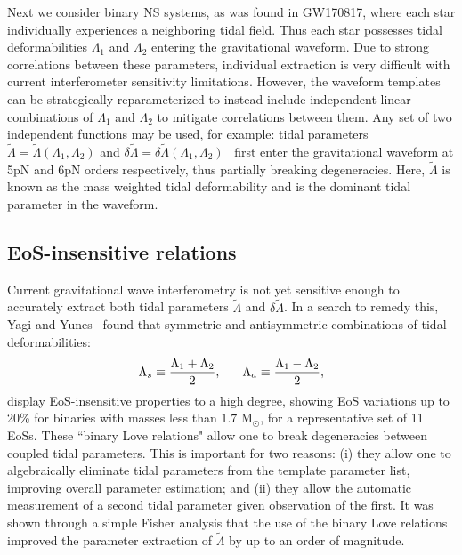 \documentclass[prd,twocolumn,nofootinbib,superscriptaddress,amsmath,amssymb]{revtex4-1}
\begin{document}
Next we consider binary NS systems, as was found in GW170817, where each star individually experiences a neighboring tidal field.
Thus each star possesses tidal deformabilities $\Lambda_1$ and $\Lambda_2$ entering the gravitational waveform.
Due to strong correlations between these parameters, individual extraction is very difficult with current interferometer sensitivity limitations.
However, the waveform templates can be strategically reparameterized to instead include independent linear combinations of $\Lambda_1$ and $\Lambda_2$ to mitigate correlations between them. 
Any set of two independent functions may be used, for example: tidal parameters $\tilde{\Lambda}=\tilde{\Lambda}(\Lambda_1,\Lambda_2)$ and $\delta \tilde{\Lambda}=\delta \tilde{\Lambda}(\Lambda_1,\Lambda_2)$~\cite{Wade:tidalCorrections} first enter the gravitational waveform at 5pN and 6pN orders respectively, thus partially breaking degeneracies.
Here, $\tilde{\Lambda}$ is known as the mass weighted tidal deformability and is the dominant tidal parameter in the waveform. 

\subsection{EoS-insensitive relations}\label{sec:eosInsensitive}
Current gravitational wave interferometry is not yet sensitive enough to accurately extract both tidal parameters $\tilde{\Lambda}$ and $\delta\tilde{\Lambda}$.
In a search to remedy this, Yagi and Yunes~\cite{Yagi:binLove} found that symmetric and antisymmetric combinations of tidal deformabilities:
\begin{equation}
\Lambda_s \equiv \frac{\Lambda_1 + \Lambda_2}{2}, \hspace{6mm} \Lambda_a \equiv \frac{\Lambda_1 - \Lambda_2}{2},
\end{equation}
display EoS-insensitive properties to a high degree, showing EoS variations up to 20\% for binaries with masses less than $1.7 \text{ M}_{\odot}$, for a representative set of 11 EoSs. 
These ``binary Love relations" allow one to break degeneracies between coupled tidal parameters.
This is important for two reasons: (i) they allow one to algebraically eliminate tidal parameters from the template parameter list, improving overall parameter estimation; and (ii) they allow the automatic measurement of a second tidal parameter given observation of the first.
It was shown through a simple Fisher analysis that the use of the binary Love relations improved the parameter extraction of $\tilde{\Lambda}$ by up to an order of magnitude.
\end{document}
